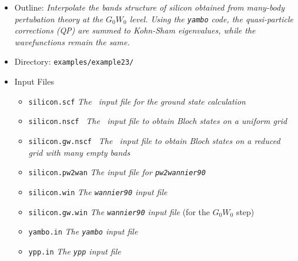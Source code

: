 \documentclass[a4paper,11pt,twoside]{article}
\begin{document}
\begin{itemize}
\item{Outline: \it{Interpolate the bands structure of silicon obtained from many-body pertubation theory at the $G_0W_0$ level. Using the {\tt yambo} code, the quasi-particle corrections (QP) are summed to Kohn-Sham eigenvalues, while the wavefunctions remain the same. }}
\item{Directory: {\tt examples/example23/}}
\item{Input Files}
\begin{itemize}
\item{ {\tt silicon.scf}  {\it The \pwscf\ input file for the ground state
    calculation}} 
\item{ {\tt silicon.nscf }  {\it The \pwscf\ input file to obtain Bloch
    states on a uniform grid}}
\item{ {\tt silicon.gw.nscf }  {\it The \pwscf\ input file to obtain Bloch
    states on a reduced grid with many empty bands}}  
\item{ {\tt silicon.pw2wan}  {\it The input file for {\tt pw2wannier90}}}
\item{ {\tt silicon.win}  {\it The {\tt wannier90} input file}}
\item{ {\tt silicon.gw.win}  {\it The {\tt wannier90} input file} (for the $G_0W_0$ step)}
\item{ {\tt yambo.in}  {\it The {\tt yambo} input file}}
\item{ {\tt ypp.in}  {\it The {\tt ypp} input file}}
\end{itemize}
\end{itemize}
\end{document}
